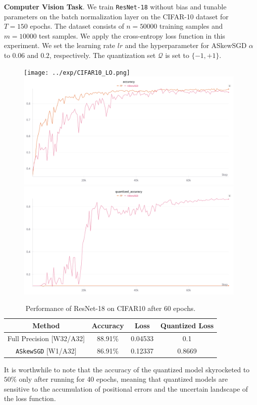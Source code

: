 \documentclass[10pt,a4paper]{article}
\begin{document}
\newpage
\textbf{Computer Vision Task}. We train \texttt{ResNet-18} without bias and tunable parameters on the batch normalization layer on the CIFAR-10 dataset for $T=150$ epochs. The dataset consists of $n=50000$ training samples and $m=10000$ test samples. We apply the cross-entropy loss function in this experiment. We set the learning rate $lr$ and the hyperparameter for ASkewSGD $\alpha$ to $0.06$ and $0.2$, respectively. The quantization set $\mathcal{Q}$ is set to $\{-1,+1\}$.
\begin{figure}[H]
  \centering
  \texttt{[image: ../exp/CIFAR10\_LO.png]}
  \includegraphics[width=0.45\linewidth]{../exp/CIFAR10_AC.png}
  \includegraphics[width=0.45\linewidth]{../exp/CIFAR10_QA.png}
\end{figure}

\begin{table}[H]
  \caption{Performance of ResNet-18 on CIFAR10 after 60 epochs.} \label{Tb:tb1}
  \begin{center}
    \begin{tabular}{cccc}
      \hline
      Method                     & Accuracy & Loss    & Quantized Loss \\ \hline
      Full Precision [W32/A32]   & 88.91\%  & 0.04533 & 0.1            \\ \hline
      \texttt{ASkewSGD} [W1/A32] & 86.91\%  & 0.12337 & 0.8669         \\ \hline
    \end{tabular}
  \end{center}
\end{table}

It is worthwhile to note that the accuracy of the quantized model skyrocketed to $50\%$ only after running for 40 epochs, meaning that quantized models are sensitive to the accumulation of positional errors and the uncertain landscape of the loss function.
\end{document}
